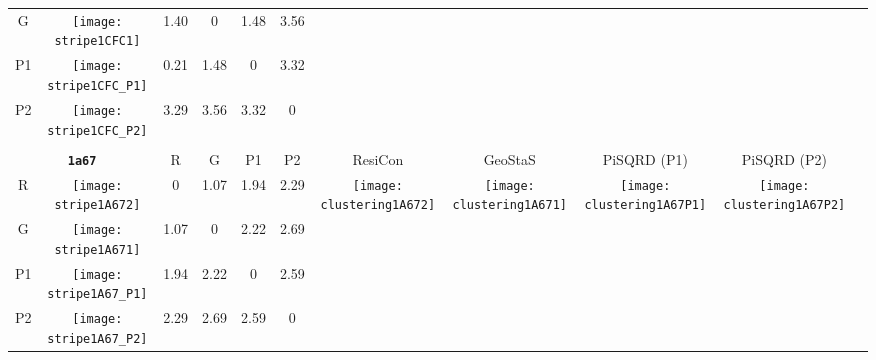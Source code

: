 \documentclass[a4paper,11pt,twoside]{book}%
\begin{document}
\begin{appendices}
\begin{sidewaystable}[h!]
\begin{tabular*}{4cm}{cc|c|c|c|c|c|c|c|c|c|}
\cline{1-6}
\multicolumn{1}{|c|}{G} & \texttt{[image: stripe1CFC1]} & 1.40 & 0 & 1.48 & 3.56 & \multirow{4}{*}{} & \multirow{4}{*}{} & \multirow{4}{*}{} & \multirow{4}{*}{} & \multirow{5}{*}{} \\
\cline{1-6}
\multicolumn{1}{|c|}{P1} & \texttt{[image: stripe1CFC\_P1]} & 0.21 & 1.48 & 0 & 3.32 & \multirow{4}{*}{} & \multirow{4}{*}{} & \multirow{4}{*}{} & \multirow{4}{*}{} & \multirow{5}{*}{}  \\
\cline{1-6}
\multicolumn{1}{|c|}{P2} & \texttt{[image: stripe1CFC\_P2]} & 3.29 & 3.56 & 3.32 & 0 & \multirow{4}{*}{} & \multirow{4}{*}{} & \multirow{4}{*}{} & \multirow{4}{*}{} & \multirow{5}{*}{}  \\
\cline{1-11}
\\
\cline{1-11}
\multicolumn{2}{|c|}{{\bf \texttt{1a67}}} & R & G & P1 & P2 & ResiCon & GeoStaS & PiSQRD (P1) & PiSQRD (P2) & \multirow{5}{*}{\vspace{-0.15cm}\texttt{[image: threeHistogram1A67]}}  \\
\cline{1-10}
\multicolumn{1}{|c|}{R} & \texttt{[image: stripe1A672]} & 0 & 1.07 & 1.94 & 2.29 & \multirow{4}{*}{\vspace{-0.3cm}\texttt{[image: clustering1A672]}} & \multirow{4}{*}{\vspace{-0.3cm}\texttt{[image: clustering1A671]}} & \multirow{4}{*}{\vspace{-0.3cm}\texttt{[image: clustering1A67P1]}} & \multirow{4}{*}{\vspace{-0.3cm}\texttt{[image: clustering1A67P2]}} &  \multirow{5}{*}{} \\
\cline{1-6}
\multicolumn{1}{|c|}{G} & \texttt{[image: stripe1A671]} & 1.07 & 0 & 2.22 & 2.69 & \multirow{4}{*}{} & \multirow{4}{*}{} & \multirow{4}{*}{} & \multirow{4}{*}{} & \multirow{5}{*}{} \\
\cline{1-6}
\multicolumn{1}{|c|}{P1} & \texttt{[image: stripe1A67\_P1]} & 1.94 & 2.22 & 0 & 2.59 & \multirow{4}{*}{} & \multirow{4}{*}{} & \multirow{4}{*}{} & \multirow{4}{*}{} & \multirow{5}{*}{}  \\
\cline{1-6}
\multicolumn{1}{|c|}{P2} & \texttt{[image: stripe1A67\_P2]} & 2.29 & 2.69 & 2.59 & 0 & \multirow{4}{*}{} & \multirow{4}{*}{} & \multirow{4}{*}{} & \multirow{4}{*}{} & \multirow{5}{*}{}  \\
\cline{1-11}
\end{tabular*}
\normalfont
\end{sidewaystable}




\end{appendices}
\end{document}
